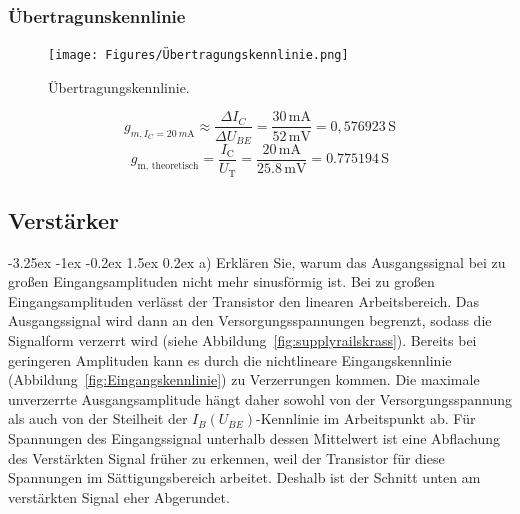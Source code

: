 \documentclass[
	a4paper, %
	12pt, %
]{CSUniSchoolLabReport}
\makeatletter
\renewcommand\paragraph{\@startsection{paragraph}{4}{\z@}%
  {-3.25ex \@plus -1ex \@minus -0.2ex}%
  {1.5ex \@plus 0.2ex}%
  {\normalfont\normalsize\bfseries}}
\newcommand{\milli}{m}
\makeatother
\begin{document}
\subsubsection{Übertragunskennlinie}
\begin{figure}[H]
	\centering
	\texttt{[image: Figures/Übertragungskennlinie.png]}
	\caption{Übertragungskennlinie.}
	\label{fig:Übertragungskennlinie2}
\end{figure}
\[
g_{m,I_C=\SI{20}{\milli\ampere}} \approx \frac{\Delta I_C}{\Delta U_{BE}} = \frac{30\,\mathrm{mA}}{52\,\mathrm{mV}} = 0{,}576923\,\mathrm{S}
\]
\[
g_{\text{m, theoretisch}} = \frac{I_{\text{C}}}{U_{\text{T}}} = \frac{20\,\text{mA}}{25.8\,\text{mV}} = 0.775194\,\text{S}
\]
\subsection{Verstärker}

\paragraph{a) Erklären Sie, warum das Ausgangssignal bei zu großen Eingangsamplituden nicht mehr sinusförmig ist.}
Bei zu großen Eingangsamplituden verlässt der Transistor den linearen Arbeitsbereich. Das Ausgangssignal wird dann an den Versorgungsspannungen begrenzt, sodass die Signalform verzerrt wird (siehe Abbildung~\ref{fig:supplyrailskrass}). Bereits bei geringeren Amplituden kann es durch die nichtlineare Eingangskennlinie (Abbildung~\ref{fig:Eingangskennlinie}) zu Verzerrungen kommen. Die maximale unverzerrte Ausgangsamplitude hängt daher sowohl von der Versorgungsspannung als auch von der Steilheit der $I_B(U_{BE})$-Kennlinie im Arbeitspunkt ab.  
Für Spannungen des Eingangssignal unterhalb dessen Mittelwert ist eine Abflachung des Verstärkten Signal früher zu erkennen, weil der Transistor für diese Spannungen im Sättigungsbereich arbeitet. Deshalb ist der Schnitt unten am verstärkten Signal eher Abgerundet. 
\end{document}
